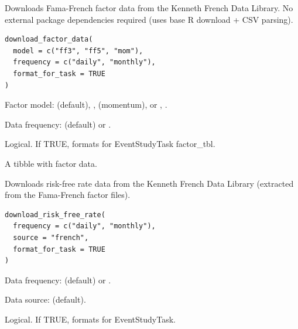\documentclass[a4paper]{book}
\begin{document}
%
\begin{Description}
Downloads Fama-French factor data from the Kenneth French Data Library.
No external package dependencies required (uses base R download + CSV parsing).
\end{Description}
%
\begin{Usage}
\begin{verbatim}
download_factor_data(
  model = c("ff3", "ff5", "mom"),
  frequency = c("daily", "monthly"),
  format_for_task = TRUE
)
\end{verbatim}
\end{Usage}
%
\begin{Arguments}
\begin{ldescription}
\item[\code{model}] Factor model:  (default), , 
(momentum), or , .

\item[\code{frequency}] Data frequency:  (default) or .

\item[\code{format\_for\_task}] Logical. If TRUE, formats for EventStudyTask factor\_tbl.
\end{ldescription}
\end{Arguments}
%
\begin{Value}
A tibble with factor data.
\end{Value}
%
\begin{Description}
Downloads risk-free rate data from the Kenneth French Data Library
(extracted from the Fama-French factor files).
\end{Description}
%
\begin{Usage}
\begin{verbatim}
download_risk_free_rate(
  frequency = c("daily", "monthly"),
  source = "french",
  format_for_task = TRUE
)
\end{verbatim}
\end{Usage}
%
\begin{Arguments}
\begin{ldescription}
\item[\code{frequency}] Data frequency:  (default) or .

\item[\code{source}] Data source:  (default).

\item[\code{format\_for\_task}] Logical. If TRUE, formats for EventStudyTask.
\end{ldescription}
\end{Arguments}
\end{document}
